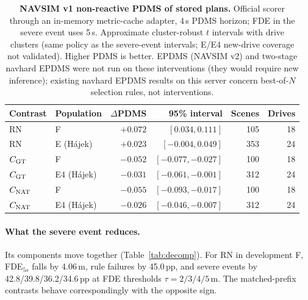 \begin{table}[h]
\centering\small
\caption{\textbf{NAVSIM v1 non-reactive PDMS of stored plans.} Official scorer through an in-memory metric-cache adapter, 4\,s PDMS horizon; FDE in the severe event uses 5\,s. Approximate cluster-robust $t$ intervals with drive clusters (same policy as the severe-event intervals; E/E4 new-drive coverage not validated). Higher PDMS is better. EPDMS (NAVSIM v2) and two-stage navhard EPDMS were not run on these interventions (they would require new inference); existing navhard EPDMS results on this server concern best-of-$N$ selection rules, not interventions.}
\label{tab:pdms}
\begin{tabular}{@{}llrrrr@{}}\toprule
Contrast & Population & $\Delta$PDMS & 95\% interval & Scenes & Drives\\\midrule
RN & F & $+0.072$ & $[0.034,0.111]$ & 105 & 18\\
RN & E (H\'ajek) & $+0.023$ & $[-0.004,0.049]$ & 353 & 24\\
$C_{\mathrm{GT}}$ & F & $-0.052$ & $[-0.077,-0.027]$ & 100 & 18\\
$C_{\mathrm{GT}}$ & E4 (H\'ajek) & $-0.031$ & $[-0.061,-0.001]$ & 312 & 24\\
$C_{\mathrm{NAT}}$ & F & $-0.055$ & $[-0.093,-0.017]$ & 100 & 18\\
$C_{\mathrm{NAT}}$ & E4 (H\'ajek) & $-0.026$ & $[-0.046,-0.007]$ & 312 & 24\\\bottomrule
\end{tabular}
\end{table}

\paragraph{What the severe event reduces.} Its components move together (Table~\ref{tab:decomp}). For RN in development F, FDE$_{5s}$ falls by 4.06\,m, rule failures by 45.0\,pp, and severe events by 42.8/39.8/36.2/34.6\,pp at FDE thresholds $\tau=2/3/4/5$\,m. The matched-prefix contrasts behave correspondingly with the opposite sign.

